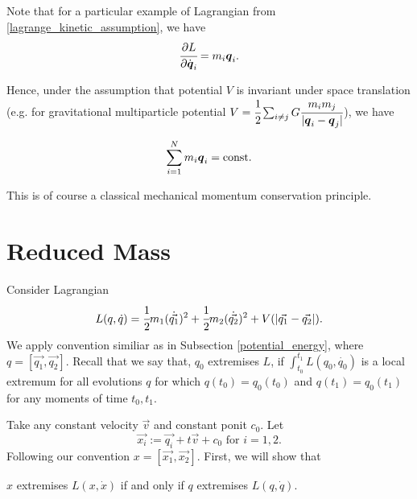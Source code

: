 \documentclass[main.tex]{subfiles}
\begin{document}
Note that for a particular example of Lagrangian from \ref{lagrange_kinetic_assumption},
we have 
\begin{equation}
\cfrac{\partial L}{\partial \dot{\boldsymbol{q}}_i} = m_i \boldsymbol{q}_i.
\end{equation}

Hence, under the assumption that potential $V$ is invariant under space translation (e.g. for gravitational multiparticle potential $V = \cfrac{1}{2}\sum_{i \not=j} G \cfrac{m_i m_j}{|\boldsymbol{q}_i - \boldsymbol{q}_j|}$), we have

\begin{equation}
\sum_{i=1}^{N}  m_i \boldsymbol{q}_i = \text{const}.
\end{equation} 

This is of course a classical mechanical momentum conservation principle.

\section{Reduced Mass}
Consider Lagrangian
\begin{equation}
\label{lagrangian-dist-dependent}
L(q, \dot{q}) = \cfrac{1}{2}m_1 (\dot{\vec{q_1}})^2 + \cfrac{1}{2}m_2 (\dot{\vec{q_2}})^2 + V(|\vec{q_1} - \vec{q_2}|).
\end{equation}
We apply convention similiar as in Subsection \ref{potential_energy}, where $q=[\vec{q_1}, \vec{q_2}]$.
Recall that we say that, $q_0$ extremises $L$, if $\int_{t_0}^{t_1} L(q_0, \dot{q_0})$ is a local extremum for all evolutions $q$ for which $q(t_0) = q_0(t_0)$ and $q(t_1) = q_0(t_1)$ for any moments of time $t_0, t_1$.

Take any constant velocity $\vec{v}$ and constant ponit $c_0$. Let
\begin{equation}
\label{inertial-coordinates-change}
\vec{x_i} := \vec{q_i} + t\vec{v} + c_0 \text{ for } i=1,2.
\end{equation}
Following our convention $x=[\vec{x_1}, \vec{x_2}]$. First, we will show that 
\begin{fact}
$x$ extremises $L(x, \dot{x})$ if and only if $q$ extremises $L(q, \dot{q})$.
\end{fact}
\end{document}
